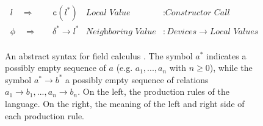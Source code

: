 \begin{figure}
{\begin{minipage}{0.95\textwidth}
\begin{align*}
        l \quad\Rightarrow\quad    & \texttt{c}(l^*)                      & \textit{Local Value}          & : \textit{Constructor Call}                          \\
        \phi \quad\Rightarrow\quad & \delta^* \rightarrow l^*             & \textit{Neighboring Value}    & : \textit{Devices} \rightarrow \textit{Local Values} \\
      \end{align*}
    \end{minipage}
  }
  \caption{
  An abstract syntax for field calculus \cite{FieldCalculus-AggregateComputing}.
  The symbol $a^*$ indicates a possibly empty sequence of $a$ (e.g.
  $a_1,...,a_n$ with $n \geq 0$), while the symbol $a^*{\rightarrow}b^*$ a
  possibly empty sequence of relations $a_1{\rightarrow}b_1,...,a_n{\rightarrow}b_n$.
  On the left, the production rules of the language. On the right, the
  meaning of the left and right side of each production rule.
  }
  \label{figure:field-calculus-language}
\end{figure}